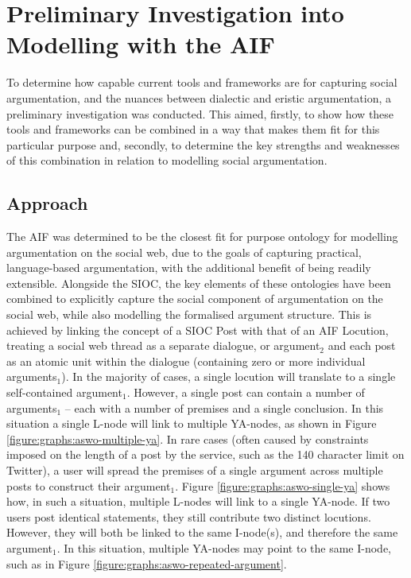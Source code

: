 \chapter{Preliminary Investigation into Modelling with the AIF}
\label{investigation}
To determine how capable current tools and frameworks are for capturing social argumentation, and the nuances between dialectic and eristic argumentation, a preliminary investigation was conducted. This aimed, firstly, to show how these tools and frameworks can be combined in a way that makes them fit for this particular purpose and, secondly, to determine the key strengths and weaknesses of this combination in relation to modelling social argumentation.


\section{Approach}
The AIF was determined to be the closest fit for purpose ontology for modelling argumentation on the social web, due to the goals of capturing practical, language-based argumentation, with the additional benefit of being readily extensible. Alongside the SIOC, the key elements of these ontologies have been combined to explicitly capture the social component of argumentation on the social web, while also modelling the formalised argument structure. This is achieved by linking the concept of a SIOC Post with that of an AIF Locution, treating a social web thread as a separate dialogue, or argument$_2$ and each post as an atomic unit within the dialogue (containing zero or more individual arguments$_1$). In the majority of cases, a single locution will translate to a single self-contained argument$_1$. However, a single post can contain a number of arguments$_1$ -- each with a number of premises and a single conclusion. In this situation a single L-node will link to multiple YA-nodes, as shown in Figure \ref{figure:graphs:aswo-multiple-ya}. In rare cases (often caused by constraints imposed on the length of a post by the service, such as the 140 character limit on Twitter), a user will spread the premises of a single argument across multiple posts to construct their argument$_1$. Figure \ref{figure:graphs:aswo-single-ya} shows how, in such a situation, multiple L-nodes will link to a single YA-node. If two users post identical statements, they still contribute two distinct locutions. However, they will both be linked to the same I-node(s), and therefore the same argument$_1$. In this situation, multiple YA-nodes may point to the same I-node, such as in Figure \ref{figure:graphs:aswo-repeated-argument}.


